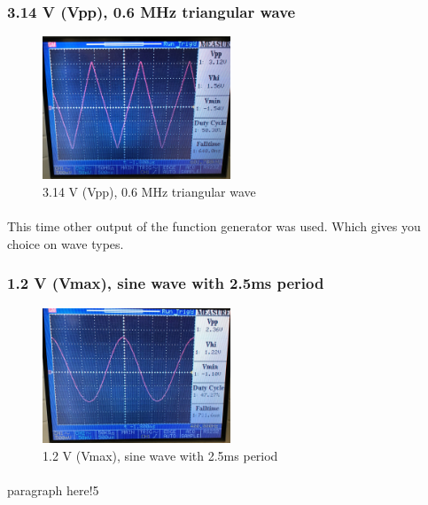 \documentclass[pdftex,12pt,a4paper]{article}
\begin{document}
\begin{flushleft}
\subsubsection{3.14 V (Vpp), 0.6 MHz triangular wave}
\begin{figure}[h]
    \centering
	\includegraphics[width=0.5\textwidth]{Photos/5_4_closeup.jpg}
	\caption{3.14 V (Vpp), 0.6 MHz triangular wave}
	\label{fig7}
\end{figure}
\paragraph{}
This time other output of the function generator was used. Which gives you choice on wave types.
\end{flushleft}


\begin{flushleft}
\subsubsection{1.2 V (Vmax), sine wave with 2.5ms period}
\begin{figure}[h]
    \centering
	\includegraphics[width=0.5\textwidth]{Photos/5_5_closeup.jpg}
	\caption{1.2 V (Vmax), sine wave with 2.5ms period}
	\label{fig8}
\end{figure}
\paragraph{}
paragraph here!5
\end{flushleft}
\end{document}
